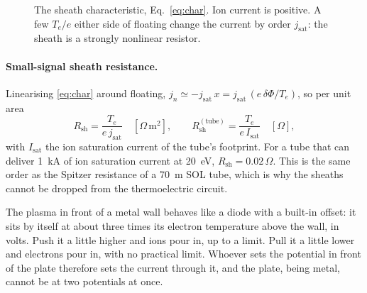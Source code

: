 \documentclass[11pt,a4paper]{article}
\newcommand{\Te}{T_e}
\newcommand{\jsat}{j_{\mathrm{sat}}}
\begin{document}
\begin{figure}[h]
\centering
{}
\caption{The sheath characteristic, Eq.~\eqref{eq:char}. Ion current is positive. A few $\Te/e$ either side of
floating change the current by order $\jsat$: the sheath is a strongly nonlinear resistor.}
\label{fig:char}
\end{figure}

\paragraph{Small-signal sheath resistance.} Linearising \eqref{eq:char} around floating,
$j_n \simeq -\jsat\,x = \jsat\,(e\,\delta\Phi/\Te)$, so per unit area
\begin{equation}
  R_{\mathrm{sh}} = \frac{\Te}{e\,\jsat}\quad[\Omega\,\mathrm{m^2}],\qquad
  R_{\mathrm{sh}}^{\mathrm{(tube)}} = \frac{\Te}{e\,I_{\mathrm{sat}}}\quad[\Omega] ,
  \label{eq:rsh}
\end{equation}
with $I_{\mathrm{sat}}$ the ion saturation current of the tube's footprint. For a tube that can deliver 1~kA of ion
saturation current at 20~eV, $R_{\mathrm{sh}} = 0.02\,\Omega$. This is the same order as the Spitzer resistance of a
70~m SOL tube, which is why the sheaths cannot be dropped from the thermoelectric circuit.

\begin{tcolorbox}[eli={ELI5: the sheath}]
The plasma in front of a metal wall behaves like a diode with a built-in offset: it sits by itself at about three
times its electron temperature above the wall, in volts. Push it a little higher and ions pour in, up to a limit.
Pull it a little lower and electrons pour in, with no practical limit. Whoever sets the potential in front of the
plate therefore sets the current through it, and the plate, being metal, cannot be at two potentials at once.
\end{tcolorbox}
\end{document}
